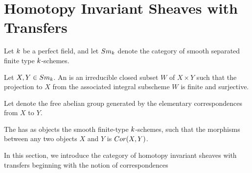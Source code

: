 \newpage
\section{Homotopy Invariant Sheaves with Transfers}\label{sect_hist}

Let $k$ be a perfect field, and let $Sm_{k}$ denote the 
category of smooth separated finite type $k$-schemes.

\begin{defn}\label{def_cor}
Let $X, Y \in Sm_{k}$. An  is an irreducible closed subset $W$ of $X \times Y$ such that 
the projection to $X$ from the associated integral subscheme $W$
is finite and surjective.

Let  denote the free abelian group generated by 
the elementary correspondences from $X$ to $Y$. 
\end{defn}

\begin{defn}
The  has as objects 
the smooth finite-type $k$-schemes, such that the 
morphisms between any two objects $X$ and $Y$ is $Cor(X, Y)$.
\end{defn}

In this section, we introduce the 
category of homotopy invariant sheaves with transfers beginning 
with the notion of correspondences
